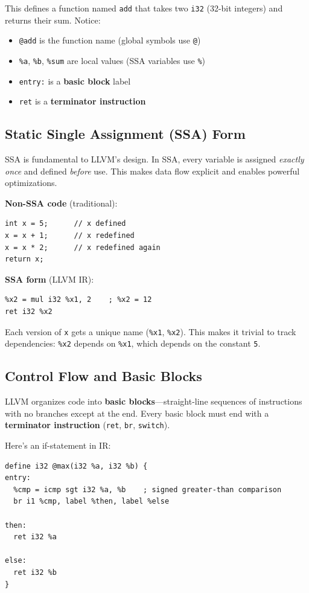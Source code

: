 \documentclass[11pt]{article}
\begin{document}
This defines a function named \texttt{add} that takes two \texttt{i32} (32-bit integers) and returns their sum. Notice:
\begin{itemize}[noitemsep]
  \item \texttt{@add} is the function name (global symbols use \texttt{@})
  \item \texttt{\%a}, \texttt{\%b}, \texttt{\%sum} are local values (SSA variables use \texttt{\%})
  \item \texttt{entry:} is a \textbf{basic block} label
  \item \texttt{ret} is a \textbf{terminator instruction}
\end{itemize}

\subsection{Static Single Assignment (SSA) Form}
SSA is fundamental to LLVM's design. In SSA, every variable is assigned \emph{exactly once} and defined \emph{before} use. This makes data flow explicit and enables powerful optimizations.

\textbf{Non-SSA code} (traditional):
\begin{lstlisting}[style=ts]
int x = 5;      // x defined
x = x + 1;      // x redefined
x = x * 2;      // x redefined again
return x;
\end{lstlisting}

\textbf{SSA form} (LLVM IR):
\begin{lstlisting}[style=ir]
%x1 = add i32 5, 1      ; %x1 = 6
%x2 = mul i32 %x1, 2    ; %x2 = 12
ret i32 %x2
\end{lstlisting}

Each version of \texttt{x} gets a unique name (\texttt{\%x1}, \texttt{\%x2}). This makes it trivial to track dependencies: \texttt{\%x2} depends on \texttt{\%x1}, which depends on the constant \texttt{5}.

\subsection{Control Flow and Basic Blocks}
LLVM organizes code into \textbf{basic blocks}—straight-line sequences of instructions with no branches except at the end. Every basic block must end with a \textbf{terminator instruction} (\texttt{ret}, \texttt{br}, \texttt{switch}).

Here's an if-statement in IR:
\begin{lstlisting}[style=ir]
define i32 @max(i32 %a, i32 %b) {
entry:
  %cmp = icmp sgt i32 %a, %b    ; signed greater-than comparison
  br i1 %cmp, label %then, label %else

then:
  ret i32 %a

else:
  ret i32 %b
}
\end{lstlisting}
\end{document}

